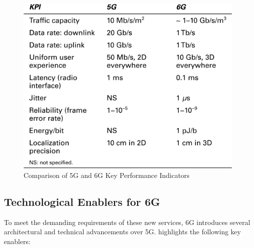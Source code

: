 \documentclass[acmtog]{acmart}
\begin{document}
\begin{figure}[h]
  \centering
  \includegraphics[width=\linewidth]{6G_kpi.png}
  \caption{Comparison of 5G and 6G Key Performance Indicators \cite{ref4}}
  \label{fig:6G_kpi}
\end{figure}

\subsection{Technological Enablers for 6G}

To meet the demanding requirements of these new services, 6G introduces several architectural and technical advancements over 5G. \citet{ref4} highlights the following key enablers:
\end{document}
